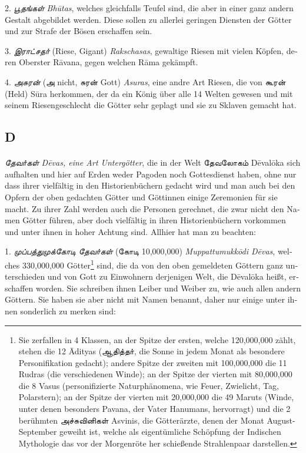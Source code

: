 \documentclass{article}
\newcommand{\TamilText}[1]{\texttamil{#1}}
\newcommand{\TamilItalic}[1]{\texttamil{\emph{#1}}}
\newcommand{\tam}[1]{\TamilText{#1}}
\newcommand{\tamitalic}[1]{\TamilItalic{#1}}
\begin{document}
{2. \tamitalic{பூதங்கள்} \emph{\textgerman{Bh\={u}tas}}, \textgerman{welches gleichfalls Teufel sind, die aber in einer ganz andern Gestalt abgebildet werden. Diese sollen zu allerlei geringen Diensten der Götter und zur Strafe der Bösen erschaffen sein.}

3. \tamitalic{இராட்சதா்} \textgerman{(Riese, Gigant) \emph{Rakschasas}, gewaltige Riesen mit vielen Köpfen, deren Oberster R\={a}vana, gegen welchen R\={a}ma gekämpft.}

4. \tamitalic{அசுரன்} \textgerman{(\tam{அ} nicht, \tam{சுரன்} Gott) \emph{Asuras}, eine andre Art Riesen, die von \tam{கூரன்} (Held) S\={u}ra herkommen, der da ein König über alle 14 Welten gewesen und mit seinem Riesengeschlecht die Götter sehr geplagt und sie zu Sklaven gemacht hat.}
\subsection*{\textgerman{D}}
\paragraph{}
\tamitalic{தேவா்கள்} \emph{\textgerman{D\={e}vas, eine Art Untergötter}}, \textgerman{die in der Welt \tam{தேவலோகம்} D\={e}val\={o}ka sich aufhalten und hier auf Erden weder Pagoden noch Gottesdienst haben, ohne nur dass ihrer vielfältig in den Historienbüchern gedacht wird und man auch bei den Opfern der oben gedachten Götter und Göttinnen einige Zeremonien für sie macht. Zu ihrer Zahl werden auch die Personen gerechnet, die zwar nicht den Namen Götter führen, aber doch vielfältig in ihren Historienbüchern vorkommen und unter ihnen in hoher Achtung sind. Allhier hat man zu beachten:}

\bigskip

1. \tamitalic{முப்பத்துமுக்கோடி} \tamitalic{தேவா்கள்} (\tam{கோடி} 10,000,000) \emph{\textgerman{Muppattumukk\={o}di D\={e}vas}}, \textgerman{welches 330,000,000 Götter\footnote{Sie zerfallen in 4 Klassen, an der Spitze der ersten, welche 120,000,000 zählt, stehen die 12 \={A}dityas (\tam{ஆதித்தா்}, die Sonne in jedem Monat als besondere Personifikation gedacht); andere Spitze der zweiten mit 100,000,000 die 11 Rudras (die verschiedenen Winde); an der Spitze der vierten mit 80,000,000 die 8 Vasus (personifizierte Naturphänomena, wie Feuer, Zwielicht, Tag, Polarstern); an der Spitze der vierten mit 20,000,000 die 49 Maruts (Winde, unter denen besonders Pavana, der Vater Hanumans, hervorragt) und die 2 berühmten \tam{அச்சுவினிகள்} Asvinis, die Götterärzte, denen der Monat August-September geweiht ist, welche als eigentümliche Schöpfung der Indischen Mythologie das vor der Morgenröte her schießende Strahlenpaar darstellen.} sind, die da von den oben gemeldeten Göttern ganz unterschieden und von Gott zu Einwohnern derjenigen Welt, die D\={e}val\={o}ka heißt, erschaffen worden. Sie schreiben ihnen Leiber und Weiber zu, wie auch allen andern Göttern. Sie haben sie aber nicht mit Namen benannt, daher nur einige unter ihnen sonderlich zu merken sind:}

}
\end{document}
